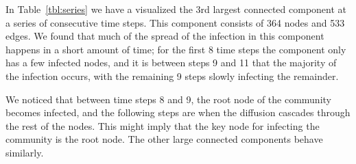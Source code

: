 \documentclass[12pt, oneside, openany]{article} %
\begin{document}
In Table~\ref{tbl:series} we have a visualized the 3rd largest connected component at a series of consecutive time steps. This component consists of 364 nodes and 533 edges. We found that much of the spread of the infection in this component happens in a short amount of time; for the first 8 time steps the component only has a few infected nodes, and it is between steps 9 and 11 that the majority of the infection occurs, with the remaining 9 steps slowly infecting the remainder.

We noticed that between time steps 8 and 9, the root node of the community becomes infected, and the following steps are when the diffusion cascades through the rest of the nodes. This might imply that the key node for infecting the community is the root node. The other large connected components behave similarly.
\end{document}
